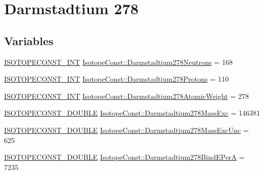 \hypertarget{group___isotope_const-_darmstadtium-_ds278}{}\section{Darmstadtium 278}
\label{group___isotope_const-_darmstadtium-_ds278}
\subsection*{Variables}
\begin{DoxyCompactItemize}
\item 
\mbox{\hyperlink{group___isotope_const-_macros_ga5f18360b3e99483a35c32d789e62621c}{I\+S\+O\+T\+O\+P\+E\+C\+O\+N\+S\+T\+\_\+\+I\+NT}} \mbox{\hyperlink{group___isotope_const-_darmstadtium-_ds278_ga05d2176772e00792772e59e5bab6fd4c}{Isotope\+Const\+::\+Darmstadtium278\+Neutrons}} = 168
\item 
\mbox{\hyperlink{group___isotope_const-_macros_ga5f18360b3e99483a35c32d789e62621c}{I\+S\+O\+T\+O\+P\+E\+C\+O\+N\+S\+T\+\_\+\+I\+NT}} \mbox{\hyperlink{group___isotope_const-_darmstadtium-_ds278_gaab290d30d01f234f65a54f5af800bc87}{Isotope\+Const\+::\+Darmstadtium278\+Protons}} = 110
\item 
\mbox{\hyperlink{group___isotope_const-_macros_ga5f18360b3e99483a35c32d789e62621c}{I\+S\+O\+T\+O\+P\+E\+C\+O\+N\+S\+T\+\_\+\+I\+NT}} \mbox{\hyperlink{group___isotope_const-_darmstadtium-_ds278_gab03accbd1aa7f2f7b2e4813ffbfc95df}{Isotope\+Const\+::\+Darmstadtium278\+Atomic\+Weight}} = 278
\item 
\mbox{\hyperlink{group___isotope_const-_macros_ga8f45a7272ce02c0b4c65c44636ed719a}{I\+S\+O\+T\+O\+P\+E\+C\+O\+N\+S\+T\+\_\+\+D\+O\+U\+B\+LE}} \mbox{\hyperlink{group___isotope_const-_darmstadtium-_ds278_ga666af747b9909806fc544dac715f6537}{Isotope\+Const\+::\+Darmstadtium278\+Mass\+Exc}} = 146381
\item 
\mbox{\hyperlink{group___isotope_const-_macros_ga8f45a7272ce02c0b4c65c44636ed719a}{I\+S\+O\+T\+O\+P\+E\+C\+O\+N\+S\+T\+\_\+\+D\+O\+U\+B\+LE}} \mbox{\hyperlink{group___isotope_const-_darmstadtium-_ds278_gaf7870045f130d95065b8c020577cf480}{Isotope\+Const\+::\+Darmstadtium278\+Mass\+Exc\+Unc}} = 625
\item 
\mbox{\hyperlink{group___isotope_const-_macros_ga8f45a7272ce02c0b4c65c44636ed719a}{I\+S\+O\+T\+O\+P\+E\+C\+O\+N\+S\+T\+\_\+\+D\+O\+U\+B\+LE}} \mbox{\hyperlink{group___isotope_const-_darmstadtium-_ds278_ga0ba86c5e199256cad314a49721afe355}{Isotope\+Const\+::\+Darmstadtium278\+Bind\+E\+PerA}} = 7235

\end{DoxyCompactItemize}
